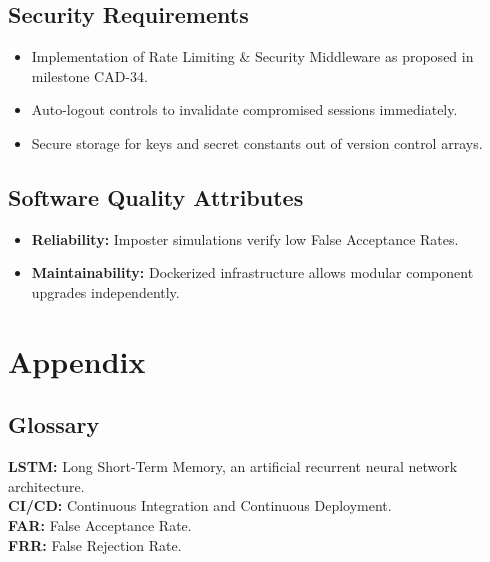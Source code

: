 \documentclass[12pt, a4paper]{article}
\begin{document}
\subsection{Security Requirements}
\begin{itemize}
    \item Implementation of Rate Limiting \& Security Middleware as proposed in milestone CAD-34.
    \item Auto-logout controls to invalidate compromised sessions immediately.
    \item Secure storage for keys and secret constants out of version control arrays.
\end{itemize}

\subsection{Software Quality Attributes}
\begin{itemize}
    \item \textbf{Reliability:} Imposter simulations verify low False Acceptance Rates.
    \item \textbf{Maintainability:} Dockerized infrastructure allows modular component upgrades independently.
\end{itemize}

\newpage
\section{Appendix}
\subsection{Glossary}
\textbf{LSTM:} Long Short-Term Memory, an artificial recurrent neural network architecture. \\
\textbf{CI/CD:} Continuous Integration and Continuous Deployment. \\
\textbf{FAR:} False Acceptance Rate. \\
\textbf{FRR:} False Rejection Rate.
\end{document}
